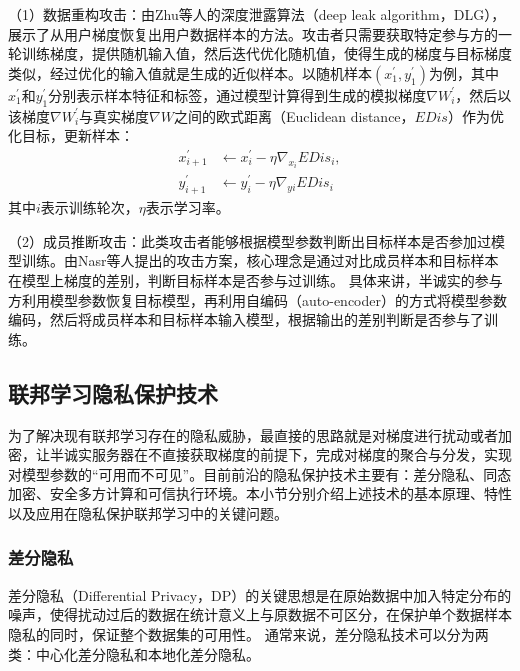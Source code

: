 （1）数据重构攻击：由Zhu等人\cite{zhu2019deep}的深度泄露算法（deep leak algorithm，DLG），展示了从用户梯度恢复出用户数据样本的方法。攻击者只需要获取特定参与方的一轮训练梯度，提供随机输入值，然后迭代优化随机值，使得生成的梯度与目标梯度类似，经过优化的输入值就是生成的近似样本。以随机样本$(x^{\prime}_1, y^{\prime}_1)$为例，其中$x^{\prime}_1$和$y^{\prime}_1$分别表示样本特征和标签，通过模型计算得到生成的模拟梯度$\nabla W^{\prime}_i$，然后以该梯度$\nabla W^{\prime}_i$与真实梯度$\nabla W$之间的欧式距离（Euclidean distance，$\textit{EDis}$）作为优化目标，更新样本：
\begin{equation}
	\begin{aligned}
		x_{i+1}^{\prime} &\leftarrow x_i^{\prime}-\eta \nabla_{x_i} \textit{EDis}_i, \\ y_{i+1}^{\prime} &\leftarrow y_i^{\prime}-\eta \nabla_{y i} \textit{EDis}_i
	\end{aligned}
\end{equation}
其中$i$表示训练轮次，$\eta$表示学习率。

（2）成员推断攻击：此类攻击者能够根据模型参数判断出目标样本是否参加过模型训练。由Nasr等人\cite{nasr2019comprehensive}提出的攻击方案，核心理念是通过对比成员样本和目标样本在模型上梯度的差别，判断目标样本是否参与过训练。
具体来讲，半诚实的参与方利用模型参数恢复目标模型，再利用自编码（auto-encoder）的方式将模型参数编码，然后将成员样本和目标样本输入模型，根据输出的差别判断是否参与了训练。


\subsection{联邦学习隐私保护技术}
为了解决现有联邦学习存在的隐私威胁，最直接的思路就是对梯度进行扰动或者加密，让半诚实服务器在不直接获取梯度的前提下，完成对梯度的聚合与分发，实现对模型参数的“可用而不可见”。目前前沿的隐私保护技术主要有：差分隐私、同态加密、安全多方计算和可信执行环境。本小节分别介绍上述技术的基本原理、特性以及应用在隐私保护联邦学习中的关键问题。

\subsubsection{差分隐私}
差分隐私（Differential Privacy，DP）\cite{dwork2006differential}的关键思想是在原始数据中加入特定分布的噪声，使得扰动过后的数据在统计意义上与原数据不可区分，在保护单个数据样本隐私的同时，保证整个数据集的可用性。
通常来说，差分隐私技术可以分为两类：中心化差分隐私和本地化差分隐私。

